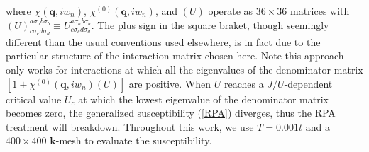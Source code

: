 \documentclass[aps,prl,twocolumn,superscriptaddress,showpacs]{revtex4-1}
\newcommand{\bs}{\boldsymbol}
\begin{document}
where $\chi(\bm{q},iw_n)$, $\chi^{(0)}(\bm{q},iw_n)$, and $(U)$ operate as $36\times36$ matrices with $(U)^{a\sigma_a b\sigma_b}_{c\sigma_cd\sigma_d}
\equiv U^{a\sigma_ab\sigma_b}_{c\sigma_cd\sigma_d}$. The plus sign in the square braket, though seemingly different than the usual conventions used elsewhere, is in fact due to the particular structure of the interaction matrix chosen here. Note this approach only works for interactions at which all the eigenvalues of the denominator
matrix $\left[1+\chi^{(0)}(\bm{q},iw_n)(U)\right]$ are positive. When $U$ reaches a $J/U$-dependent critical value $U_c$ at which the lowest eigenvalue of the denominator matrix becomes zero, the generalized susceptibility (\ref{RPA}) diverges, thus the RPA treatment will breakdown. Throughout this work, we use $T=0.001t$ and a $400\times 400$ $\bs k$-mesh to evaluate the susceptibility.

\end{document}
